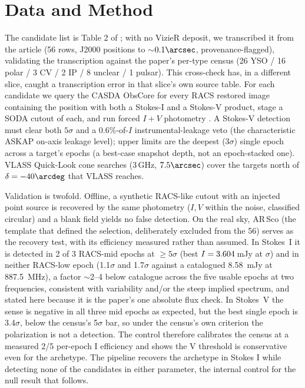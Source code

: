 \documentclass[twocolumn]{aastex631}
\newcommand{\code}[1]{\texttt{#1}}
\begin{document}
\section{Data and Method}
\label{sec:method}
The candidate list is Table 2 of \citet{pelisoli2025}; with no VizieR deposit, we transcribed it
from the article (56 rows, J2000 positions to $\sim$$0.1\arcsec$, provenance-flagged), validating
the transcription against the paper's per-type census (26 YSO / 16 polar / 3 CV / 2 IP /
8 unclear / 1 pulsar). This cross-check has, in a different slice, caught a transcription error in that slice's own
source table.
For each candidate we query the CASDA ObsCore for every RACS restored image containing the
position with both a Stokes-I and a Stokes-V product, stage a SODA cutout of each, and run forced
$I{+}V$ photometry \citep[the tested \code{measure\_circular\_pol};][locking the measurement to
the catalogue position turns a non-detection into an honest limit rather than a miss]{driessen2024}.
A Stokes-V detection must clear both $5\sigma$ and a $0.6\%$-of-$I$ instrumental-leakage veto
(the characteristic ASKAP on-axis leakage level); upper limits are the deepest ($3\sigma$)
single epoch across a target's epochs (a best-case snapshot depth, not an epoch-stacked one).
VLASS Quick-Look cone searches (3\,GHz, $7.5\arcsec$) cover the targets north of
$\delta=-40\arcdeg$ that VLASS reaches.

Validation is twofold. Offline, a synthetic RACS-like cutout with an injected point source is
recovered by the same photometry ($I,V$ within the noise, classified circular) and a blank
field yields no false detection. On the real sky, AR\,Sco (the template that defined the
selection, deliberately excluded from the 56) serves as the recovery test, with its efficiency
measured rather than assumed. In Stokes~I it is detected in 2 of 3 RACS-mid epochs at
$\ge 5\sigma$ (best $I=3.604$\,mJy at \wdRealControlSnr$\sigma$) and in neither
RACS-low epoch (1.1$\sigma$ and 1.7$\sigma$ against a catalogued 8.58~mJy at 887.5~MHz), a
factor $\sim$2--4 below catalogue across the five usable epochs at two frequencies,
consistent with variability and/or the steep implied spectrum, and stated here because it is
the paper's one absolute flux check. In Stokes~V the sense is negative in all three mid epochs as expected, but the best
single epoch is 3.4$\sigma$, below the census's 5$\sigma$ bar, so under the census's own
criterion the polarization is not a detection. The control therefore calibrates the census at a
measured 2/5 per-epoch I efficiency and shows the V threshold is conservative even for the
archetype. The pipeline recovers the archetype in Stokes I while detecting none of the
candidates in either parameter, the internal control for the null result that follows.
\end{document}
